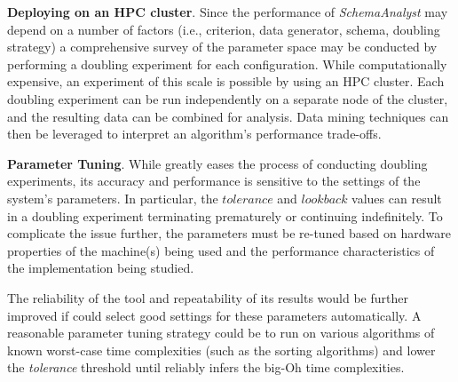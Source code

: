 
{\bf Deploying on an HPC cluster}.
Since the performance of \textit{SchemaAnalyst} may depend on a number
of factors (i.e., criterion, data generator, schema, doubling strategy) a
comprehensive survey of the parameter space may be conducted by
performing a doubling experiment for each configuration. While
computationally expensive, an experiment of this scale is possible by
using an HPC cluster. Each doubling experiment can be run independently
on a separate node of the cluster, and the resulting data can be combined
for analysis. Data mining techniques can then be leveraged to interpret
an algorithm's performance trade-offs.


 {\bf Parameter Tuning}.  While \toolname greatly eases the process of
 conducting doubling experiments, its accuracy and performance is sensitive to
 the settings of the system's parameters.  In particular, the
 $\mathit{tolerance}$ and $\mathit{lookback}$ values can result in a doubling
 experiment terminating prematurely or continuing indefinitely.  To complicate
 the issue further, the parameters must be re-tuned based on hardware
 properties of the machine(s) being used and the performance characteristics of
 the implementation being studied.

  The reliability of the tool and repeatability of its results would be further
  improved if \toolname could select good settings for these parameters
  automatically. A reasonable parameter tuning strategy could be to run
  \toolname on various algorithms of known worst-case time complexities (such
  as the sorting algorithms) and lower the \textit{tolerance} threshold until
  \toolname reliably infers the big-Oh time complexities.

